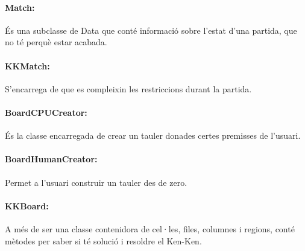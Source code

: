 \documentclass[a4paper,12pt]{article}
\begin{document}
\paragraph{Match:}És una subclasse de Data que conté informació sobre l’estat d’una partida, que no té perquè estar acabada.

\paragraph{KKMatch:}S’encarrega de que es compleixin les restriccions durant la partida.

\paragraph{BoardCPUCreator:}És la classe encarregada de crear un tauler donades certes premisses de l’usuari.

\paragraph{BoardHumanCreator:}Permet a l’usuari construir un tauler des de zero.

\paragraph{KKBoard:}A més de ser una classe contenidora de cel·les, files, columnes i regions, conté mètodes per saber si té solució i resoldre el Ken-Ken.
\end{document}
